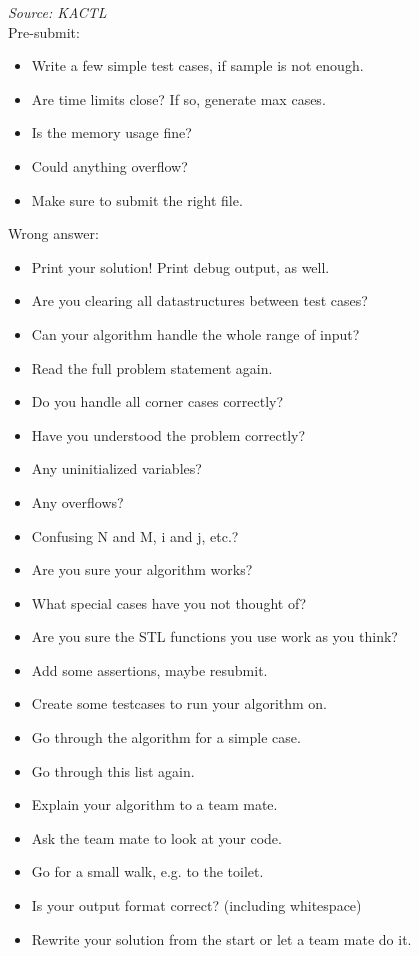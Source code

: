 \textit{Source: KACTL} \\

Pre-submit:

\begin{itemize}
\item Write a few simple test cases, if sample is not enough.
\item Are time limits close? If so, generate max cases.
\item Is the memory usage fine?
\item Could anything overflow?
\item Make sure to submit the right file.
\end{itemize}

Wrong answer:
\begin{itemize}
\item Print your solution! Print debug output, as well.
\item Are you clearing all datastructures between test cases?
\item Can your algorithm handle the whole range of input?
\item Read the full problem statement again.
\item Do you handle all corner cases correctly?
\item Have you understood the problem correctly?
\item Any uninitialized variables?
\item Any overflows?
\item Confusing N and M, i and j, etc.?
\item Are you sure your algorithm works?
\item What special cases have you not thought of?
\item Are you sure the STL functions you use work as you think?
\item Add some assertions, maybe resubmit.
\item Create some testcases to run your algorithm on.
\item Go through the algorithm for a simple case.
\item Go through this list again.
\item Explain your algorithm to a team mate.
\item Ask the team mate to look at your code.
\item Go for a small walk, e.g. to the toilet.
\item Is your output format correct? (including whitespace)
\item Rewrite your solution from the start or let a team mate do it.
\end{itemize}

